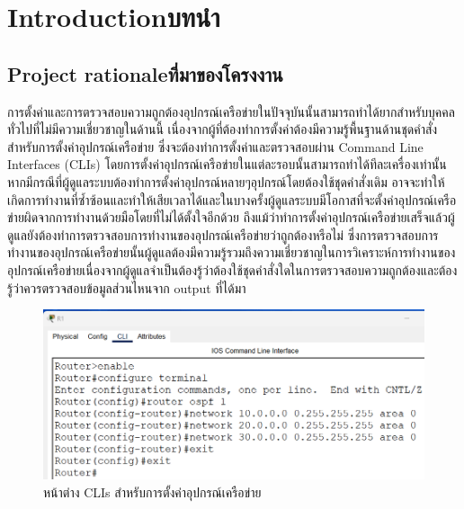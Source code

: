 \chapter{\ifenglish Introduction\else บทนำ\fi}

\section{\ifenglish Project rationale\else ที่มาของโครงงาน\fi}
\hspace{0.5in}
การตั้งค่าและการตรวจสอบความถูกต้องอุปกรณ์เครือข่ายในปัจจุบันนั้นสามารถทำได้ยากสำหรับบุคคลทั่วไปที่ไม่มีความเชี่ยวชาญในด้านนี้ เนื่องจากผู้ที่ต้องทำการตั้งค่าต้องมีความรู้พื้นฐานด้านชุดคำสั่งสำหรับการตั้งค่าอุปกรณ์เครือข่าย ซึ่งจะต้องทำการตั้งค่าและตรวจสอบผ่าน Command Line Interfaces (CLIs) โดยการตั้งค่าอุปกรณ์เครือข่ายในแต่ละรอบนั้นสามารถทำได้ทีละเครื่องเท่านั้น หากมีกรณีที่ผู้ดูแลระบบต้องทำการตั้งค่าอุปกรณ์หลายๆอุปกรณ์โดยต้องใช้ชุดคำสั่งเดิม อาจจะทำให้เกิดการทำงานที่ซ้ำซ้อนและทำให้เสียเวลาได้และในบางครั้งผู้ดูแลระบบมีโอกาสที่จะตั้งค่าอุปกรณ์เครือข่ายผิดจากการทำงานด้วยมือโดยที่ไม่ได้ตั้งใจอีกด้วย
ถึงแม้ว่าทำการตั้งค่าอุปกรณ์เครือข่ายเสร็จแล้วผู้ดูแลยังต้องทำการตรวจสอบการทำงานของอุปกรณ์เครือข่ายว่าถูกต้องหรือไม่ ซึ่งการตรวจสอบการทำงานของอุปกรณ์เครือข่ายนั้นผู้ดูแลต้องมีความรู้รวมถึงความเชี่ยวชาญในการวิเคราะห์การทำงานของอุปกรณ์เครือข่ายเนื่องจากผู้ดูแลจำเป็นต้องรู้ว่าต้องใช้ชุดคำสั่งใดในการตรวจสอบความถูกต้องและต้องรู้ว่าควรตรวจสอบข้อมูลส่วนไหนจาก output ที่ได้มา


\begin{figure}[h]
    \begin{center}
      \includegraphics[scale=0.3]{RouterConf.png}
    \end{center}
    \caption[หน้าต่าง CLIs สำหรับการตั้งค่าอุปกรณ์เครือข่าย]{หน้าต่าง CLIs สำหรับการตั้งค่าอุปกรณ์เครือข่าย}
    \label{fig:RouterCLIs}
  \end{figure}

